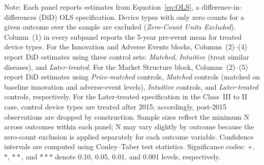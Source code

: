 \documentclass[letterpaper,12pt]{article}
\theoremstyle{definition}
\begin{document}
\begin{table}[t]
\begin{threeparttable}
\begin{tablenotes}\footnotesize
\item[] Note: Each panel reports estimates from Equation~\ref{eq:OLS}, a difference-in-differences (DiD) OLS specification. Device types with only zero counts for a given outcome over the sample are excluded (\emph{Zero-Count Units Excluded}). Column~(1) in every subpanel reports the 5-year pre-event mean for treated device types. For the Innovation and Adverse Events blocks, Columns~(2)–(4) report DiD estimates using three control sets: \emph{Matched}, \emph{Intuitive} (treat similar diseases), and \emph{Later-treated}. For the Market Structure block, Columns~(2)–(5) report DiD estimates using \emph{Price-matched} controls, \emph{Matched} controls (matched on baseline innovation and adverse-event levels), \emph{Intuitive} controls, and \emph{Later-treated} controls, respectively. For the Later-treated specification in the Class~III to II case, control device types are treated after 2015; accordingly, post-2015 observations are dropped by construction. Sample sizes reflect the minimum N across outcomes within each panel; N may vary slightly by outcome because the zero-count exclusion is applied separately for each outcome variable. Confidence intervals are computed using Conley–Taber test statistics. Significance codes: $+$, $*$, $**$, and $***$ denote 0.10, 0.05, 0.01, and 0.001 levels, respectively.
\end{tablenotes}

\end{threeparttable}
\end{table}

\clearpage
\newpage



\clearpage
\newpage


\end{document}
